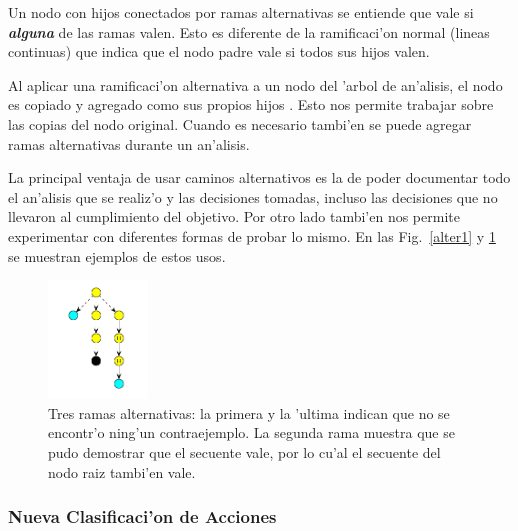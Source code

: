 Un nodo con hijos conectados por ramas alternativas se entiende que vale si \textit{\textbf{alguna}} de las ramas valen. Esto es diferente de la ramificaci'on normal (lineas continuas) que indica que el nodo padre vale si todos sus hijos valen.

Al aplicar una ramificaci'on alternativa a un nodo del 'arbol de an'alisis, el nodo es copiado y agregado como sus propios hijos . Esto nos permite trabajar sobre las copias del nodo original. Cuando es necesario tambi'en se puede agregar ramas alternativas durante un an'alisis.
 
La principal ventaja de usar caminos alternativos es la de poder documentar todo el an'alisis que se realiz'o y las decisiones tomadas, incluso las decisiones que no llevaron al cumplimiento del objetivo. Por otro lado tambi'en nos permite experimentar con diferentes formas de probar lo mismo.
En las Fig.~\ref{alter1} y \ref{alter2} se muestran ejemplos de estos usos.

\begin{figure}[bth]
	\includegraphics[width=100px]{img/ramas_alternativas.png}
	\centering
	\caption{Tres ramas alternativas: la primera y la 'ultima indican que no se encontr'o ning'un contraejemplo. La segunda rama muestra que se pudo demostrar que el secuente vale, por lo cu'al el secuente del nodo raiz tambi'en vale.}
        \label{alter2}
\end{figure}



\subsubsection{Nueva Clasificaci'on de Acciones}


